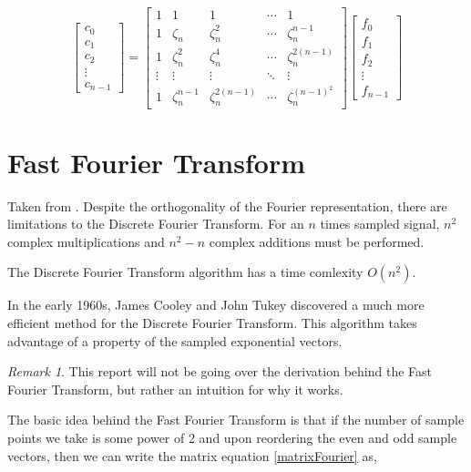 \documentclass[11pt]{amsart}
\theoremstyle{definition}
\theoremstyle{remark}
\newtheorem{rem}[thm]{Remark}
\numberwithin{equation}{section}
\begin{document}
\begin{equation}
	\begin{bmatrix}
		c_{0} \\
		c_{1} \\
		c_{2} \\
		\vdots \\
		c_{n-1} 
	\end{bmatrix}
	=
	\begin{bmatrix}
		1 & 1 & 1 & \cdots & 1 \\
		1 & \zeta_n & \zeta_n^2 & \cdots & \zeta_n^{n-1} \\
		1 & \zeta_n^2 & \zeta_n^4 & \cdots & \zeta_n^{2(n-1)} \\
		\vdots & \vdots & \vdots & \ddots & \vdots \\
		1 & \zeta_n^{n-1} & \zeta_n^{2(n-1)} & \cdots & \zeta_n^{(n-1)^2}
	\end{bmatrix}
	\begin{bmatrix}
		f_0 \\
		f_1 \\
		f_2 \\
		\vdots \\
		f_{n-1}
	\end{bmatrix}
	\label{matrixFourier}
\end{equation}

\section{Fast Fourier Transform}
Taken from \cite{Brunton_Kutz_2022}. Despite the orthogonality of the Fourier representation, there are limitations to the Discrete Fourier Transform. For an $n$ times sampled signal, $n^2$ complex multiplications and $n^2 - n$ complex additions must be performed.

The Discrete Fourier Transform algorithm has a time comlexity $O(n^2)$.

In the early 1960s, James Cooley and John Tukey discovered a much more efficient method for the Discrete Fourier Transform. This algorithm takes advantage of a property of the sampled exponential vectors.

\begin{rem}
	This report will not be going over the derivation behind the Fast Fourier Transform, but rather an intuition for why it works.
\end{rem}

The basic idea behind the Fast Fourier Transform is that if the number of sample points we take is some power of 2 and upon reordering the even and odd sample vectors, then we can write the matrix equation \ref{matrixFourier} as,
\end{document}
